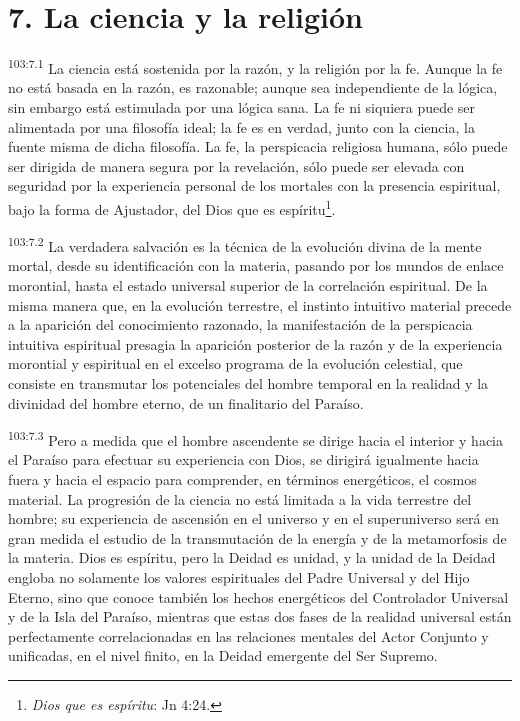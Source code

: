 \section*{7. La ciencia y la religión}
\par
\textsuperscript{103:7.1} La ciencia está sostenida por la razón, y la religión por la fe. Aunque la fe no está basada en la razón, es razonable; aunque sea independiente de la lógica, sin embargo está estimulada por una lógica sana. La fe ni siquiera puede ser alimentada por una filosofía ideal; la fe es en verdad, junto con la ciencia, la fuente misma de dicha filosofía. La fe, la perspicacia religiosa humana, sólo puede ser dirigida de manera segura por la revelación, sólo puede ser elevada con seguridad por la experiencia personal de los mortales con la presencia espiritual, bajo la forma de Ajustador, del Dios que es espíritu\footnote{\textit{Dios que es espíritu}: Jn 4:24.}.

\par
\textsuperscript{103:7.2} La verdadera salvación es la técnica de la evolución divina de la mente mortal, desde su identificación con la materia, pasando por los mundos de enlace morontial, hasta el estado universal superior de la correlación espiritual. De la misma manera que, en la evolución terrestre, el instinto intuitivo material precede a la aparición del conocimiento razonado, la manifestación de la perspicacia intuitiva espiritual presagia la aparición posterior de la razón y de la experiencia morontial y espiritual en el excelso programa de la evolución celestial, que consiste en transmutar los potenciales del hombre temporal en la realidad y la divinidad del hombre eterno, de un finalitario del Paraíso.

\par
\textsuperscript{103:7.3} Pero a medida que el hombre ascendente se dirige hacia el interior y hacia el Paraíso para efectuar su experiencia con Dios, se dirigirá igualmente hacia fuera y hacia el espacio para comprender, en términos energéticos, el cosmos material. La progresión de la ciencia no está limitada a la vida terrestre del hombre; su experiencia de ascensión en el universo y en el superuniverso será en gran medida el estudio de la transmutación de la energía y de la metamorfosis de la materia. Dios es espíritu, pero la Deidad es unidad, y la unidad de la Deidad engloba no solamente los valores espirituales del Padre Universal y del Hijo Eterno, sino que conoce también los hechos energéticos del Controlador Universal y de la Isla del Paraíso, mientras que estas dos fases de la realidad universal están perfectamente correlacionadas en las relaciones mentales del Actor Conjunto y unificadas, en el nivel finito, en la Deidad emergente del Ser Supremo.

